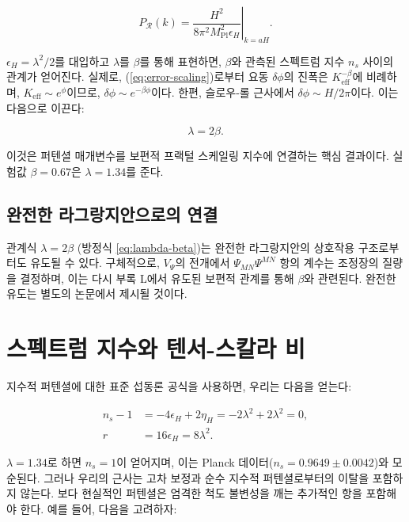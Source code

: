 \documentclass[11pt,a4paper]{article}
\newcommand{\Keff}{K_{\mathrm{eff}}}
\newcommand{\Mpl}{M_{\mathrm{Pl}}}
\newcommand{\rs}{r}
\begin{document}
	\begin{equation}
		P_{\mathcal{R}}(k) = \left. \frac{H^2}{8\pi^2 \Mpl^2 \epsilon_H} \right|_{k=aH}.
	\end{equation}
	
	\(\epsilon_H = \lambda^2/2\)를 대입하고 \(\lambda\)를 \(\beta\)를 통해 표현하면, \(\beta\)와 관측된 스펙트럼 지수 \(n_s\) 사이의 관계가 얻어진다. 실제로, (\ref{eq:error-scaling})로부터 요동 \(\delta \phi\)의 진폭은 \(\Keff^{-\beta}\)에 비례하며, \(\Keff \sim e^{\phi}\)이므로, \(\delta \phi \sim e^{-\beta \phi}\)이다. 한편, 슬로우-롤 근사에서 \(\delta \phi \sim H/2\pi\)이다. 이는 다음으로 이끈다:
	
	\begin{equation}
		\lambda = 2\beta.
		\label{eq:lambda-beta}
	\end{equation}
	
	이것은 퍼텐셜 매개변수를 보편적 프랙털 스케일링 지수에 연결하는 핵심 결과이다. 실험값 \(\beta = 0.67\)은 \(\lambda = 1.34\)를 준다.
	
	\subsection{완전한 라그랑지안으로의 연결}
	
	관계식 \(\lambda = 2\beta\) (방정식 \ref{eq:lambda-beta})는 완전한 라그랑지안의 상호작용 구조로부터도 유도될 수 있다. 구체적으로, \(V_{\Psi}\)의 전개에서 \(\Psi_{MN}\Psi^{MN}\) 항의 계수는 조정장의 질량을 결정하며, 이는 다시 부록 L에서 유도된 보편적 관계를 통해 \(\beta\)와 관련된다. 완전한 유도는 별도의 논문에서 제시될 것이다.
	
	\section{스펙트럼 지수와 텐서-스칼라 비}
	\label{sec:predictions}
	
	지수적 퍼텐셜에 대한 표준 섭동론 공식을 사용하면, 우리는 다음을 얻는다:
	
	\begin{align}
		n_s - 1 &= -4\epsilon_H + 2\eta_H = -2\lambda^2 + 2\lambda^2 = 0, \label{eq:ns-temp}\\
		\rs &= 16\epsilon_H = 8\lambda^2. \label{eq:r-pred}
	\end{align}
	
	\(\lambda = 1.34\)로 하면 \(n_s = 1\)이 얻어지며, 이는 Planck 데이터(\(n_s = 0.9649 \pm 0.0042\))와 모순된다. 그러나 우리의 근사는 고차 보정과 순수 지수적 퍼텐셜로부터의 이탈을 포함하지 않는다. 보다 현실적인 퍼텐셜은 엄격한 척도 불변성을 깨는 추가적인 항을 포함해야 한다. 예를 들어, 다음을 고려하자:
	
\end{document}
